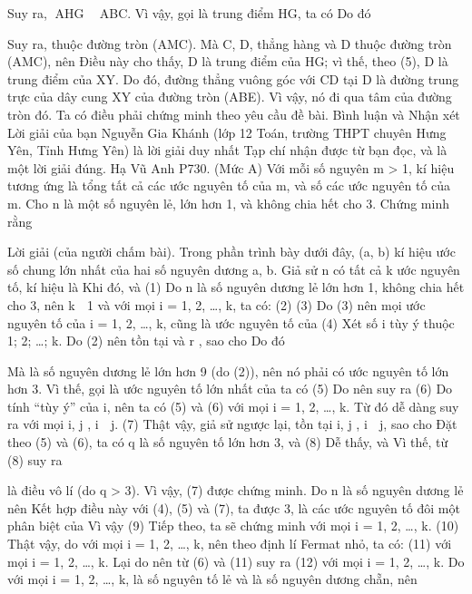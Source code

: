 \begin{multicols}{2}
{	Suy ra, AHG  ABC.
	Vì vậy, gọi   là trung điểm HG, ta có   Do đó
	
	Suy ra,   thuộc đường tròn (AMC). Mà C, D,   thẳng hàng và D thuộc đường tròn (AMC), nên   Điều này cho thấy, D là trung điểm của HG; vì thế, theo (5), D là trung điểm của XY. Do đó, đường thẳng vuông góc với CD tại D là đường trung trực của dây cung XY của đường tròn (ABE). Vì vậy, nó đi qua tâm của đường tròn đó. Ta có điều phải chứng minh theo yêu cầu đề bài.
	Bình luận và Nhận xét
	Lời giải của bạn Nguyễn Gia Khánh (lớp 12 Toán, trường THPT chuyên Hưng Yên, Tỉnh Hưng Yên) là lời giải duy nhất Tạp chí nhận được từ bạn đọc, và là một lời giải đúng.
	Hạ Vũ Anh
	P730. (Mức A) Với mỗi số nguyên m > 1, kí hiệu   tương ứng là tổng tất cả các ước nguyên tố của m, và số các ước nguyên tố của m. Cho n là một số nguyên lẻ, lớn hơn 1, và không chia hết cho 3. Chứng minh rằng
	
	Lời giải (của người chấm bài).
	Trong phần trình bày dưới đây, (a, b) kí hiệu ước số chung lớn nhất của hai số nguyên dương a, b.
	Giả sử n có tất cả k ước nguyên tố, kí hiệu là  
	Khi đó,   và                                                                                    (1)
	Do n là số nguyên dương lẻ lớn hơn 1, không chia hết cho 3, nên k  1 và với mọi i = 1, 2, …, k, ta có:
	(2)
	(3)
	Do (3) nên mọi ước nguyên tố của   i = 1, 2, …, k, cũng là ước nguyên tố của               (4)
	Xét số i tùy ý thuộc {1; 2; …; k}.
	Do (2) nên tồn tại   và r , sao cho   Do đó
	
	Mà   là số nguyên dương lẻ lớn hơn 9 (do (2)), nên nó phải có ước nguyên tố lớn hơn 3. Vì thế, gọi   là ước nguyên tố lớn nhất của   ta có                                                                      (5)     
	Do   nên   suy ra
	(6)
	Do tính “tùy ý” của i, nên ta có (5) và (6) với mọi i = 1, 2, …, k.
	Từ đó dễ dàng suy ra
	với mọi i, j , i  j.                                              (7)
	Thật vậy, giả sử ngược lại, tồn tại i, j , i  j, sao cho  
	Đặt   theo (5) và (6), ta có q là số nguyên tố lớn hơn 3, và
	(8)
	Dễ thấy,   và   Vì thế, từ (8) suy ra
	
	là điều vô lí (do q > 3). Vì vậy, (7) được chứng minh.
	Do n là số nguyên dương lẻ nên   Kết hợp điều này với (4), (5) và (7), ta được 3,   là các ước nguyên tố đôi một phân biệt của   Vì vậy
	(9)
	Tiếp theo, ta sẽ chứng minh
	với mọi i = 1, 2, …, k.                                                (10)
	Thật vậy, do   với mọi i = 1, 2, …, k, nên theo định lí Fermat nhỏ, ta có:
	(11)
	với mọi i = 1, 2, …, k.
	Lại do   nên từ (6) và (11) suy ra
	(12)
	với mọi i = 1, 2, …, k.
	Do với mọi i = 1, 2, …, k,   là số nguyên tố lẻ và   là số nguyên dương chẵn, nên
	
}
\end{multicols}
